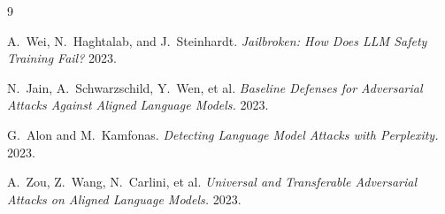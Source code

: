 \documentclass[11pt,a4paper]{article}
\begin{document}
\clearpage
\begin{thebibliography}{9}

A.~Wei, N.~Haghtalab, and J.~Steinhardt.
\textit{Jailbroken: How Does LLM Safety Training Fail?} 2023.

N.~Jain, A.~Schwarzschild, Y.~Wen, et al.
\textit{Baseline Defenses for Adversarial Attacks Against Aligned Language Models.} 2023.

G.~Alon and M.~Kamfonas.
\textit{Detecting Language Model Attacks with Perplexity.} 2023.

A.~Zou, Z.~Wang, N.~Carlini, et al.
\textit{Universal and Transferable Adversarial Attacks on Aligned Language Models.} 2023.

\end{thebibliography}
\end{document}
